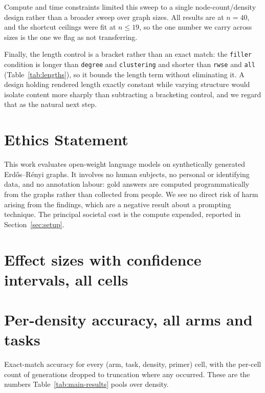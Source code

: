 \documentclass[11pt]{article}
\begin{document}
Compute and time constraints limited this sweep to a single
node-count/density design rather than a broader sweep over graph sizes. All
results are at $n{=}40$, and the shortcut ceilings were fit at $n \le 19$,
so the one number we carry across sizes is the one we flag as not
transferring.

Finally, the length control is a bracket rather than an exact match: the
\texttt{filler} condition is longer than \texttt{degree} and
\texttt{clustering} and shorter than \texttt{rwse} and \texttt{all}
(Table~\ref{tab:lengths}), so it bounds the length term without
eliminating it. A design holding rendered length exactly constant while
varying structure would isolate content more sharply than subtracting a
bracketing control, and we regard that as the natural next step.

\section*{Ethics Statement}

This work evaluates open-weight language models on synthetically generated
Erd\H{o}s--R\'enyi graphs. It involves no human subjects, no personal or
identifying data, and no annotation labour: gold answers are computed
programmatically from the graphs rather than collected from people. We see
no direct risk of harm arising from the findings, which are a negative
result about a prompting technique. The principal societal cost is the
compute expended, reported in Section~\ref{sec:setup}.



\appendix

\section{Effect sizes with confidence intervals, all cells}
\label{sec:appendix-ci}



\section{Per-density accuracy, all arms and tasks}
\label{sec:appendix-density}

Exact-match accuracy for every (arm, task, density, primer) cell, with the
per-cell count of generations dropped to truncation where any occurred.
These are the numbers Table~\ref{tab:main-results} pools over density.


\end{document}
